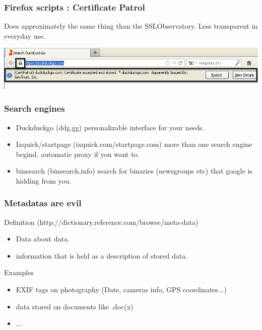 \begin{frame}
\frametitle{Firefox scripts : Certificate Patrol}
Does approximately the same thing than the SSLObservatory. Less transparent in
everyday use.
\begin{center}
\includegraphics[scale=0.4] {./materials/CertificatePatrol.png}
\end{center}
\end{frame}
\begin{frame}
\frametitle{Search engines}
\begin{itemize}
\item Duckduckgo (ddg.gg) personalizable interface for your needs.
\item Ixquick/startpage (ixquick.com/startpage.com) more than one search engine
begind, automatic proxy if you want to.
\item binsearch (binsearch.info) search for binaries (newsgroups etc) that
google is hidding from you.
\end{itemize}
\end{frame}
\begin{frame}
\frametitle{Metadatas are evil}
\begin{block}{Definition (http://dictionary.reference.com/browse/meta-data)}
\begin{itemize}
\item Data about data.
\item information that is held as a description of stored data.
\end{itemize}
\end{block}
\begin{block}{Examples}
\begin{itemize}
\item EXIF tags on photography (Date, cameras info, GPS coordinates...)
\item data stored on documents like .doc(x)
\item ...
\end{itemize}
\end{block}
\end{frame}
